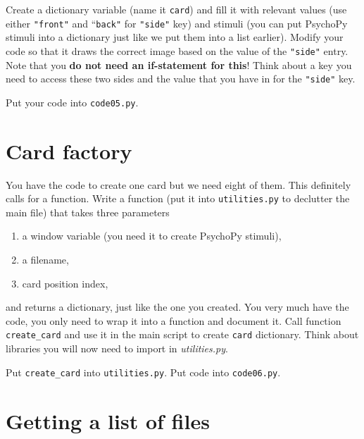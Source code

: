 \documentclass[
]{book}
\providecommand{\tightlist}{%
  \setlength{\itemsep}{0pt}\setlength{\parskip}{0pt}}
\begin{document}
Create a dictionary variable (name it \texttt{card}) and fill it with relevant values (use either \texttt{"front"} and ``\texttt{back"} for \texttt{"side"} key) and stimuli (you can put PsychoPy stimuli into a dictionary just like we put them into a list earlier). Modify your code so that it draws the correct image based on the value of the \texttt{"side"} entry. Note that you \textbf{do not need an if-statement for this}! Think about a key you need to access these two sides and the value that you have in for the \texttt{"side"} key.

Put your code into \texttt{code05.py}.

\hypertarget{card-factory}{%
\section{Card factory}\label{card-factory}}

You have the code to create one card but we need eight of them. This definitely calls for a function. Write a function (put it into \texttt{utilities.py} to declutter the main file) that takes three parameters

\begin{enumerate}
\def\labelenumi{\arabic{enumi}.}
\tightlist
\item
  a window variable (you need it to create PsychoPy stimuli),
\item
  a filename,
\item
  card position index,
\end{enumerate}

and returns a dictionary, just like the one you created. You very much have the code, you only need to wrap it into a function and document it. Call function \texttt{create\_card} and use it in the main script to create \texttt{card} dictionary. Think about libraries you will now need to import in \emph{utilities.py}.

Put \texttt{create\_card} into \texttt{utilities.py}.
Put code into \texttt{code06.py}.

\hypertarget{getting-a-list-of-files}{%
\section{Getting a list of files}\label{getting-a-list-of-files}}
\end{document}
